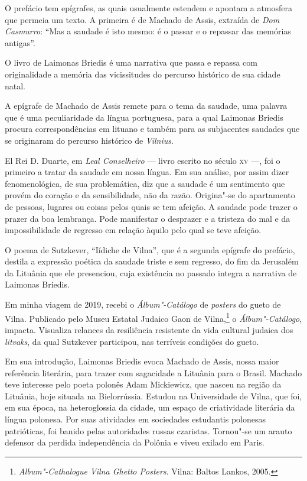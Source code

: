 O prefácio tem epígrafes, as quais usualmente estendem e apontam a
atmosfera que permeia um texto. A primeira é de Machado de Assis,
extraída de \textit{Dom Casmurro}: ``Mas a saudade é isto mesmo: é o
passar e o repassar das memórias antigas''.

O livro de Laimonas Briedis é uma narrativa que passa e repassa com
originalidade a memória das vicissitudes do percurso histórico de sua
cidade natal.

A epígrafe de Machado de Assis remete para o tema da saudade, uma
palavra que é uma peculiaridade da língua portuguesa, para a qual
Laimonas Briedis procura correspondências em lituano e também para as
subjacentes saudades que se originaram do percurso histórico de \textit{Vilnius}.

El Rei D. Duarte, em \textit{Leal Conselheiro} --- livro escrito no século \textsc{xv} ---, 
foi o primeiro a tratar da saudade em nossa língua. Em sua análise, por assim dizer
fenomenológica, de sua problemática, diz que a saudade é um sentimento
que provém do coração e da sensibilidade, não da razão. Origina"-se do
apartamento de pessoas, lugares ou coisas pelos quais se tem afeição. A
saudade pode trazer o prazer da boa lembrança. Pode manifestar o
desprazer e a tristeza do mal e da impossibilidade de regresso em
relação àquilo pelo qual se teve afeição.

O poema de Sutzkever, ``Iídiche de Vilna'', que é a segunda epígrafe do
prefácio, destila a expressão poética da saudade triste e sem regresso,
do fim da Jerusalém da Lituânia que ele presenciou, cuja existência no
passado integra a narrativa de Laimonas Briedis.

Em minha viagem de 2019, recebi o \textit{Álbum"-Catálogo} de
\textit{posters} do gueto de Vilna. Publicado pelo Museu Estatal Judaico Gaon de
Vilna,\footnote{\textit{Album"-Cathalogue Vilna Ghetto Posters}. Vilna: Baltos Lankos, 2005.} o 
\textit{Álbum"-Catálogo}, impacta. Visualiza relances da resiliência
resistente da vida cultural judaica dos \textit{litvaks}, da qual
Sutzkever participou, nas terríveis condições do gueto.

Em sua introdução, Laimonas Briedis evoca Machado de Assis, nossa
maior referência literária, para trazer com sagacidade a Lituânia para
o Brasil. Machado teve interesse pelo poeta polonês Adam Mickiewicz, que
nasceu na região da Lituânia, hoje situada na Bielorrússia. Estudou na
Universidade de Vilna, que foi, em sua época, na heteroglossia da
cidade, um espaço de criatividade literária da língua polonesa. Por suas
atividades em sociedades estudantis polonesas patrióticas, foi banido
pelas autoridades russas czaristas. Tornou"-se um arauto defensor da
perdida independência da Polônia e viveu exilado em Paris.

